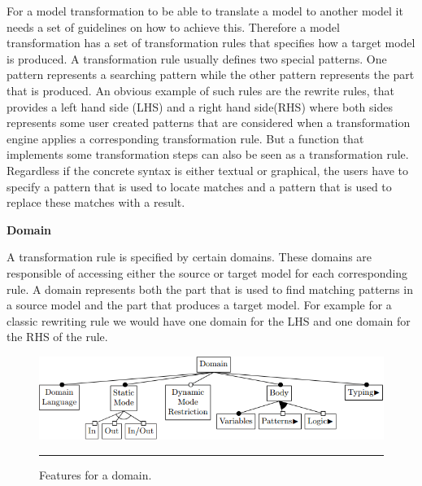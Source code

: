 For a model transformation to be able to translate a model to another model it
needs a set of guidelines on how to achieve this. Therefore a model
transformation has a set of transformation rules that specifies how a target
model is produced. A transformation rule usually defines two special patterns.
One pattern represents a searching pattern while the other pattern represents
the part that is produced.  An obvious example of such rules are the rewrite
rules, that provides a left hand side (LHS) and a right hand side(RHS) where
both sides represents some user created patterns that are considered when a
transformation engine applies a corresponding transformation rule. But a
function that implements some transformation steps can also be seen as a
transformation rule. Regardless if the concrete syntax is either textual or
graphical, the users have to specify a pattern that is used to locate matches
and a pattern that is used to replace these matches with a result.

\textbf{Domain}
\label{domain}

A transformation rule is specified by certain domains. These domains are
responsible of accessing either the source or target model for each
corresponding rule. A domain represents both the part that is used to find
matching patterns in a source model and the part that produces a target model.
For example for a classic rewriting rule we would have one domain for the LHS
and one domain for the RHS of the rule. 

\begin{figure}[H]
  \centering
    \includegraphics[scale=0.65]{./Figures/Domain_1.png}
    \rule{35em}{0.5pt}
  \caption[Feature diagram a domain]
  {Features for a domain.}
  \label{fig:Domain}
\end{figure}

